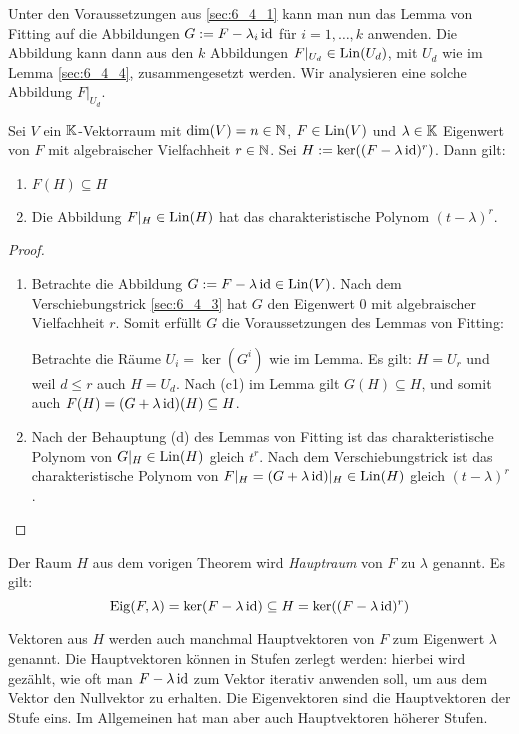 Unter den Voraussetzungen aus \ref{sec:6_4_1} kann man nun das Lemma von Fitting auf die Abbildungen $ G := F - \lambda_i \operatorname{id} $ für $ i = 1, \ldots, k $ anwenden. Die Abbildung kann dann aus den $k$ Abbildungen $ F|_{U_d} \in \operatorname{Lin}(U_d) $, mit $ U_d $ wie im Lemma \ref*{sec:6_4_4}, zusammengesetzt werden. Wir analysieren eine solche Abbildung $ F|_{U_d} $.

\begin{thm}
	Sei $ V $ ein $ \mathbb K $-Vektorraum mit $ \dim(V) = n \in \mathbb N $, $ F \in \operatorname{Lin}(V) $ und $ \lambda \in \mathbb K $ Eigenwert von $ F $ mit algebraischer Vielfachheit $ r \in \mathbb N $. Sei $ H := \ker((F-\lambda \operatorname{id})^r) $. Dann gilt:
	\begin{enumerate}
		\item
		$ F(H) \subseteq H $
		\item
		Die Abbildung $ F|_H \in \operatorname{Lin}(H) $ hat das charakteristische Polynom $ (t-\lambda)^r $.
	\end{enumerate}
\end{thm}
\begin{proof}\
	\begin{enumerate}
		\item
		Betrachte die Abbildung $ G := F - \lambda\operatorname{id} \in \operatorname{Lin}(V) $. Nach dem Verschiebungstrick \ref{sec:6_4_3} hat $ G $ den Eigenwert 0 mit algebraischer Vielfachheit $ r $. Somit erfüllt $ G $ die Voraussetzungen des Lemmas von Fitting:
		
		Betrachte die Räume $ U_i = \ker(G^i) $ wie im Lemma. Es gilt: $ H = U_r $ und weil $ d \leq r $ auch $ H = U_d $. Nach (c1) im Lemma gilt $ G(H) \subseteq H $, und somit auch $ F(H) = (G + \lambda\operatorname{id})(H) \subseteq H $.
		\item
		Nach der Behauptung (d) des Lemmas von Fitting ist das charakteristische Polynom von $ G|_H \in \operatorname{Lin}(H) $ gleich $ t^r $. Nach dem Verschiebungstrick ist das charakteristische Polynom von $ F|_H = (G+\lambda\operatorname{id})|_H \in \operatorname{Lin}(H) $ gleich $ (t - \lambda)^r $. \qedhere
	\end{enumerate}
\end{proof}

\noindent Der Raum $ H $ aus dem vorigen Theorem wird \emph{Hauptraum} von $ F $ zu $ \lambda $ genannt. Es gilt:
\begin{equation}
	\operatorname{Eig}(F,\lambda) = \ker(F - \lambda\operatorname{id}) \subseteq H = \ker((F - \lambda\operatorname{id})^r)
\end{equation}

Vektoren aus $H$ werden auch manchmal Hauptvektoren von $F$ zum Eigenwert $\lambda$ genannt. Die Hauptvektoren können in Stufen zerlegt werden: hierbei wird gezählt, wie oft man $ F - \lambda \operatorname{id}$ zum Vektor iterativ anwenden soll, um aus dem Vektor den Nullvektor zu erhalten. Die Eigenvektoren sind die Hauptvektoren der Stufe eins. Im Allgemeinen hat man aber auch Hauptvektoren höherer Stufen. 

